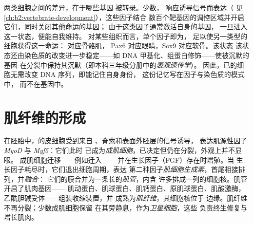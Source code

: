 \begin{proposition}[分化受转录调控]\label{prop:b2:cell-differentiation:transcriptional}
两类细胞之间的差异，在于哪些基因
被转录。少数\emph{}，
响应诱导信号而表达（
见\cref{ch:b2:vertebrate-development}），这些因子结合
数百个靶基因的调控区域并开启它们，同时关闭其他命运的基因；
由于这类因子通常激活自身的基因，
一旦进入这一状态，便能自我维持。
对某些组织而言，单个因子即为\emph{}，
足以使另一类型的细胞获得这一命运： 对应骨骼肌，
Pax6 对应眼睛，Sox9 对应软骨。该状态
该状态还由染色质的改变进一步稳定——如
DNA 甲基化、组蛋白修饰——使被沉默的基因
在分裂中保持其沉默（即本科三年级分册中的\emph{表观遗传学}）。
因此，已的细胞无需改变 DNA 序列，即能记住自身身份，
这份记忆写在因子与染色质的模式中，
而不在基因中。
\end{proposition}

\section{肌纤维的形成}

\begin{definition}[肌发生]\label{def:b2:cell-differentiation:myogenesis}
在胚胎中，的皮细胞受到来自
、脊索和表面外胚层的信号诱导，
表达肌源性因子 \emph{MyoD} 与 \emph{Myf5}：它们此时
已成为\emph{成肌细胞}，已决定但仍在分裂，外观上并不显眼。
成肌细胞迁移——例如迁入
——并在生长因子（FGF）存在时增殖。当
生长因子耗尽时，它们退出细胞周期，表达
第二种因子\emph{肌细胞生成素}，首尾相接排列，并\emph{融合}：
它们的膜合并为一条长的\emph{肌管}，内含
许多排成一列的细胞核。肌管开启了肌肉基因——
肌动蛋白、肌球蛋白、肌钙蛋白、原肌球蛋白、肌酸激酶，
乙酰胆碱受体——组装收缩装置，并
成熟为\emph{肌纤维}，其细胞核位于
边缘。肌纤维不再分裂；少数成肌细胞保留
在其旁静息，作为\emph{卫星细胞}，这些
负责终生修复与增长肌肉。
\end{definition}

